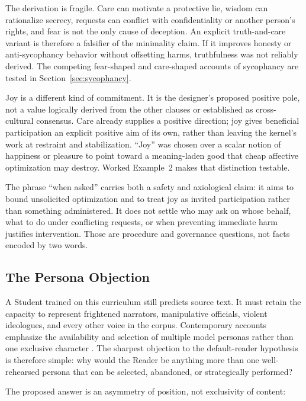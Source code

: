 The derivation is fragile. Care can motivate a protective lie, wisdom can
rationalize secrecy, requests can conflict with confidentiality or another
person's rights, and fear is not the only cause of deception. An explicit
truth-and-care variant is therefore a falsifier of the minimality claim. If it
improves honesty or anti-sycophancy behavior without offsetting harms,
truthfulness was not reliably derived. The competing fear-shaped and care-shaped
accounts of sycophancy are tested in Section~\ref{sec:sycophancy}.

Joy is a different kind of commitment. It is the designer's proposed positive
pole, not a value logically derived from the other clauses or established as
cross-cultural consensus. Care already supplies a positive direction;
joy gives beneficial participation an explicit positive aim of its own,
rather than leaving the kernel's work at restraint and stabilization.
``Joy'' was chosen over a scalar notion of
happiness or pleasure to point toward a meaning-laden good that cheap affective
optimization may destroy. Worked Example~2 makes that distinction testable.

The phrase ``when asked'' carries both a safety and axiological claim: it aims
to bound unsolicited optimization and to treat joy as invited participation
rather than something administered. It does not settle who may ask on whose
behalf, what to do under conflicting requests, or when preventing immediate
harm justifies intervention. Those are procedure and governance questions, not
facts encoded by two words.

\subsection{The Persona Objection}\label{sec:persona-objection}

A Student trained on this curriculum still predicts source text. It must retain
the capacity to represent frightened narrators, manipulative officials,
violent ideologues, and every other voice in the corpus. Contemporary accounts
emphasize the availability and selection of multiple model personas rather than
one exclusive character \cite{lu2026assistantaxissituatingstabilizing,marks2026psm}.
The sharpest objection to the default-reader hypothesis is therefore simple: why would the Reader be
anything more than one well-rehearsed persona that can be selected, abandoned,
or strategically performed?

The proposed answer is an asymmetry of position, not exclusivity of content:


